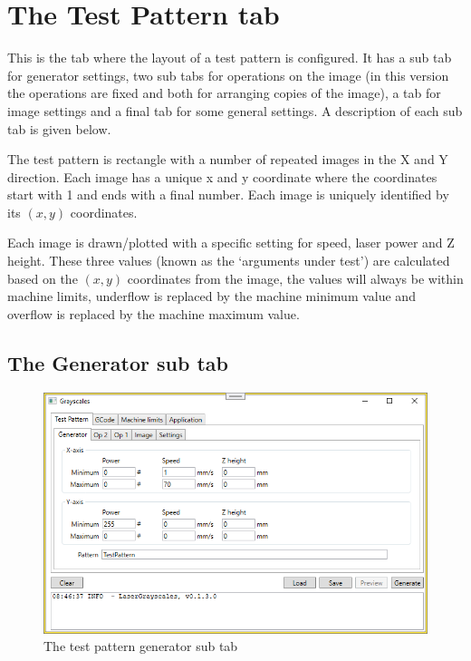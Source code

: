\section{The Test Pattern tab}\label{TestPatternTab}

This is the tab where the layout of a test pattern is configured. It has a sub tab for generator settings, two sub tabs for operations on the image (in this version
the operations are fixed and both for arranging copies of the image), a tab for image settings and a final tab for some general settings. A description of each
sub tab is given below.

The test pattern is rectangle with a number of repeated images in the X and Y direction. Each image has a unique x and y coordinate where the coordinates start
with 1 and ends with a final number. Each image is uniquely identified by its $(x, y)$ coordinates.

Each image is drawn/plotted with a specific setting for speed, laser power and Z height. These three values (known as the `arguments under test') are calculated
based on the $(x, y)$ coordinates from the image, the values will always be within machine limits, underflow is replaced by the machine minimum value and overflow
is replaced by the machine maximum value.

\subsection{The Generator sub tab}\label{TestPatternGeneratorTab}
\begin{figure}[h!]
    \centering
    \includegraphics[width=0.8\linewidth]{./images/Generator.png}
    \caption{The test pattern generator sub tab}
\end{figure}

